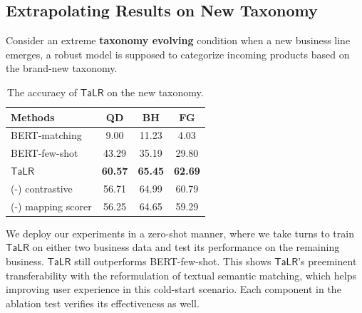 \subsection{Extrapolating Results on New Taxonomy}
\label{sec:new tax}

Consider an extreme \textbf{taxonomy evolving} condition when a new business line emerges, a robust model is supposed to categorize incoming products based on the brand-new taxonomy. 

\begin{table}[th]
  \small
  \caption{The accuracy of $\mathsf{TaLR}$ on the new taxonomy. }
  \label{tb:zeroshot}
  \centering
  \begin{tabular}{l|ccc}
    \toprule
    Methods & QD & BH & FG \\
    \midrule
    BERT-matching & 9.00 & 11.23 & 4.03 \\
    BERT-few-shot & 43.29 & 35.19 & 29.80 \\
    \midrule
    $\mathsf{TaLR}$ & \textbf{60.57} & \textbf{65.45} & \textbf{62.69}\\
    (-) contrastive & 56.71 & 64.99 & 60.79\\
    (-) mapping scorer & 56.25 & 64.65 & 59.29\\
    \bottomrule
  \end{tabular}
\end{table}

We deploy our experiments in a zero-shot manner, where we take turns to train $\mathsf{TaLR}$ on either two business data and test its performance on the remaining business. $\mathsf{TaLR}$ still outperforms BERT-few-shot. 
This shows $\mathsf{TaLR}$'s preeminent transferability with the reformulation of textual semantic matching, which helps improving user experience in this cold-start scenario.
Each component in the ablation test verifies its effectiveness as well. 

